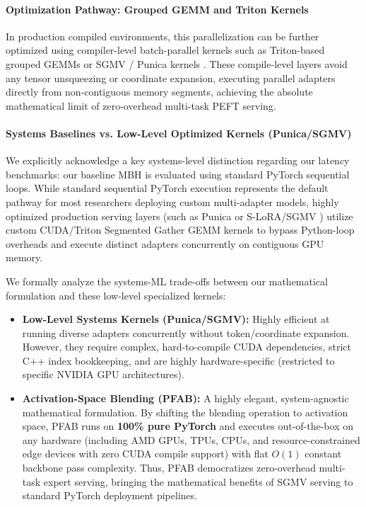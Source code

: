 \paragraph{Optimization Pathway: Grouped GEMM and Triton Kernels}
In production compiled environments, this parallelization can be further optimized using compiler-level batch-parallel kernels such as Triton-based grouped GEMMs or \textsc{SGMV} / Punica kernels \cite{sgmv2023, punica2023}. These compile-level layers avoid any tensor unsqueezing or coordinate expansion, executing parallel adapters directly from non-contiguous memory segments, achieving the absolute mathematical limit of zero-overhead multi-task PEFT serving.

\paragraph{Systems Baselines vs. Low-Level Optimized Kernels (Punica/SGMV)}
We explicitly acknowledge a key systems-level distinction regarding our latency benchmarks: our baseline MBH is evaluated using standard PyTorch sequential loops. While standard sequential PyTorch execution represents the default pathway for most researchers deploying custom multi-adapter models, highly optimized production serving layers (such as Punica \cite{punica2023} or S-LoRA/SGMV \cite{sgmv2023}) utilize custom CUDA/Triton Segmented Gather GEMM kernels to bypass Python-loop overheads and execute distinct adapters concurrently on contiguous GPU memory. 

We formally analyze the systems-ML trade-offs between our mathematical formulation and these low-level specialized kernels:
\begin{itemize}
  \item \textbf{Low-Level Systems Kernels (Punica/SGMV):} Highly efficient at running diverse adapters concurrently without token/coordinate expansion. However, they require complex, hard-to-compile CUDA dependencies, strict C++ index bookkeeping, and are highly hardware-specific (restricted to specific NVIDIA GPU architectures).
  \item \textbf{Activation-Space Blending (PFAB):} A highly elegant, system-agnostic mathematical formulation. By shifting the blending operation to activation space, PFAB runs on \textbf{100\% pure PyTorch} and executes out-of-the-box on any hardware (including AMD GPUs, TPUs, CPUs, and resource-constrained edge devices with zero CUDA compile support) with flat $O(1)$ constant backbone pass complexity. Thus, PFAB democratizes zero-overhead multi-task expert serving, bringing the mathematical benefits of SGMV serving to standard PyTorch deployment pipelines.
\end{itemize}

